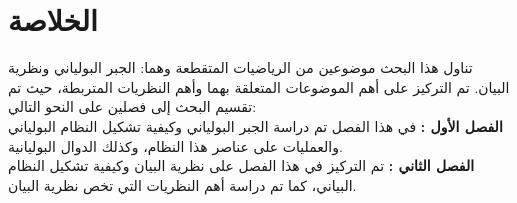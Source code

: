 \chapter*{الخلاصة}

تناول هذا البحث موضوعين من الرياضيات المتقطعة وهما: الجبر البولياني ونظرية البيان. تم التركيز على أهم الموضوعات المتعلقة بهما وأهم النظريات المتربطة، حيث تم تقسيم البحث إلى فصلين على النحو التالي:\\
\noindent
\textbf{الفصل الأول :} في هذا الفصل تم دراسة الجبر البولياني وكيفية تشكيل النظام البولياني والعمليات على عناصر هذا النظام، وكذلك الدوال البوليانية.\\
\noindent
\textbf{الفصل الثاني :} تم التركيز في هذا الفصل على نظرية البيان وكيفية تشكيل النظام البياني، كما تم دراسة أهم النظريات التي تخص نظرية البيان.
